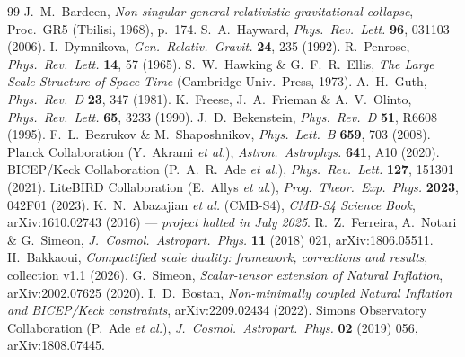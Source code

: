 \documentclass[11pt,a4paper]{article}
\theoremstyle{plain}
\theoremstyle{remark}
\begin{document}
\begin{thebibliography}{99}\small
{} J.\ M.\ Bardeen, \textit{Non-singular general-relativistic gravitational collapse}, Proc.\ GR5 (Tbilisi, 1968), p.\ 174.
 S.\ A.\ Hayward, \textit{Phys.\ Rev.\ Lett.} \textbf{96}, 031103 (2006).
 I.\ Dymnikova, \textit{Gen.\ Relativ.\ Gravit.} \textbf{24}, 235 (1992).
 R.\ Penrose, \textit{Phys.\ Rev.\ Lett.} \textbf{14}, 57 (1965).
 S.\ W.\ Hawking \& G.\ F.\ R.\ Ellis, \textit{The Large Scale Structure of Space-Time} (Cambridge Univ.\ Press, 1973).
 A.\ H.\ Guth, \textit{Phys.\ Rev.\ D} \textbf{23}, 347 (1981).
 K.\ Freese, J.\ A.\ Frieman \& A.\ V.\ Olinto, \textit{Phys.\ Rev.\ Lett.} \textbf{65}, 3233 (1990).
 J.\ D.\ Bekenstein, \textit{Phys.\ Rev.\ D} \textbf{51}, R6608 (1995).
 F.\ L.\ Bezrukov \& M.\ Shaposhnikov, \textit{Phys.\ Lett.\ B} \textbf{659}, 703 (2008).
 Planck Collaboration (Y.\ Akrami \textit{et al.}), \textit{Astron.\ Astrophys.} \textbf{641}, A10 (2020).
 BICEP/Keck Collaboration (P.\ A.\ R.\ Ade \textit{et al.}), \textit{Phys.\ Rev.\ Lett.} \textbf{127}, 151301 (2021).
 LiteBIRD Collaboration (E.\ Allys \textit{et al.}), \textit{Prog.\ Theor.\ Exp.\ Phys.} \textbf{2023}, 042F01 (2023).
 K.\ N.\ Abazajian \textit{et al.} (CMB-S4), \textit{CMB-S4 Science Book}, arXiv:1610.02743 (2016) --- \emph{project halted in July 2025}.
 R.\ Z.\ Ferreira, A.\ Notari \& G.\ Simeon, \textit{J.\ Cosmol.\ Astropart.\ Phys.} \textbf{11} (2018) 021, arXiv:1806.05511.
 H.\ Bakkaoui, \textit{Compactified scale duality: framework, corrections and results}, collection v1.1 (2026).
 G.\ Simeon, \textit{Scalar-tensor extension of Natural Inflation}, arXiv:2002.07625 (2020).
 I.\ D.\ Bostan, \textit{Non-minimally coupled Natural Inflation and BICEP/Keck constraints}, arXiv:2209.02434 (2022).
 Simons Observatory Collaboration (P.\ Ade \textit{et al.}), \textit{J.\ Cosmol.\ Astropart.\ Phys.} \textbf{02} (2019) 056, arXiv:1808.07445.
\end{thebibliography}
\end{document}
